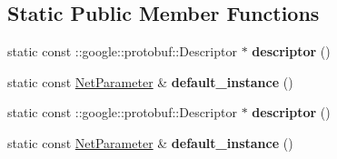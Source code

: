 \subsection*{Static Public Member Functions}
\begin{DoxyCompactItemize}
\item 
\mbox{\label{classcaffe_1_1_net_parameter_a79abd4ecb336a0b28a6b713499c543d3}} 
static const \+::google\+::protobuf\+::\+Descriptor $\ast$ {\bfseries descriptor} ()
\item 
\mbox{\label{classcaffe_1_1_net_parameter_a476f02107de3d22929b93c8263f02d96}} 
static const \mbox{\hyperlink{classcaffe_1_1_net_parameter}{Net\+Parameter}} \& {\bfseries default\+\_\+instance} ()
\item 
\mbox{\label{classcaffe_1_1_net_parameter_aae5b24d63cb031f43fd67f2a6f08b052}} 
static const \+::google\+::protobuf\+::\+Descriptor $\ast$ {\bfseries descriptor} ()
\item 
\mbox{\label{classcaffe_1_1_net_parameter_ae3d0019fbbb456878419e63aad4f34e4}} 
static const \mbox{\hyperlink{classcaffe_1_1_net_parameter}{Net\+Parameter}} \& {\bfseries default\+\_\+instance} ()
\end{DoxyCompactItemize}
